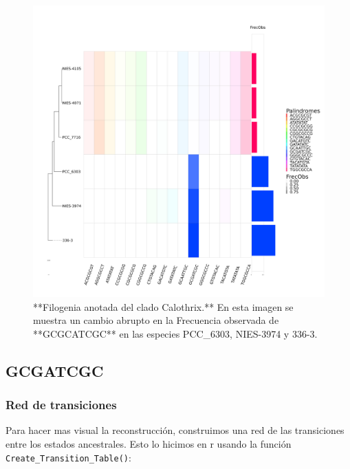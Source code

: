 \documentclass[
]{book}
\begin{document}
\begin{figure}

{\centering \includegraphics[width=1\linewidth]{Clados/Callothrix_clade/figures/Calothrix_Octanuc_FrecObs_sel32_filogenia_HIG} 

}

\caption{**Filogenia anotada del clado Calothrix.** En esta imagen se muestra un cambio abrupto en la Frecuencia observada de **GCGCATCGC** en las especies PCC\_6303, NIES-3974 y 336-3.}\label{fig:FIG12}
\end{figure}

\hypertarget{gcgatcgc}{%
\subsection{GCGATCGC}\label{gcgatcgc}}

\hypertarget{red-de-transiciones}{%
\subsubsection{Red de transiciones}\label{red-de-transiciones}}

Para hacer mas visual la reconstrucción, construimos una red de las transiciones entre los estados ancestrales. Esto lo hicimos en r usando la función \texttt{Create\_Transition\_Table()}:
\end{document}
